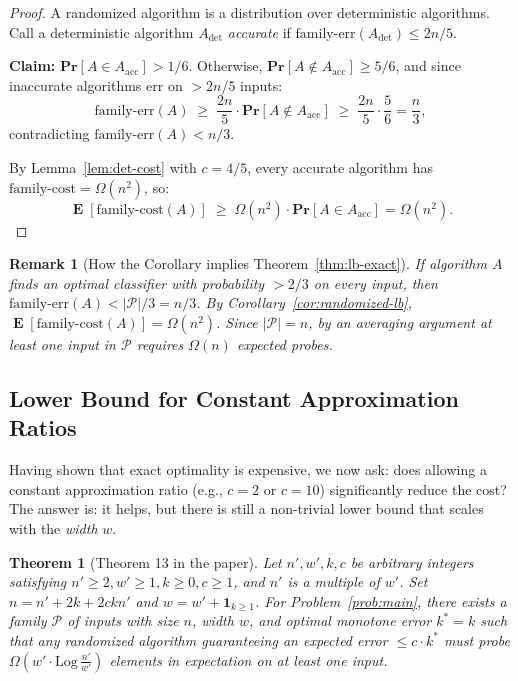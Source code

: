 \documentclass[11pt, a4paper]{article}
\theoremstyle{boxed}
\newtheorem{innertheorem}{Theorem}[section]
\newtheorem{innerremark}{Remark}[section]
\newenvironment{theorem}
  {\begin{mdframed}[style=thmstyle]\begin{innertheorem}}
  {\end{innertheorem}\end{mdframed}}
\newenvironment{remark}
  {\begin{mdframed}[style=notestyle]\begin{innerremark}}
  {\end{innerremark}\end{mdframed}}
\DeclareMathOperator{\E}{\mathbf{E}}
\renewcommand{\Pr}{\mathbf{Pr}}
\newcommand{\kstar}{k^{*}}
\begin{document}
\begin{proof}
  A randomized algorithm is a distribution over deterministic algorithms. Call a deterministic algorithm $A_\mathrm{det}$ \emph{accurate} if $\mathrm{family\text{-}err}(A_\mathrm{det}) \le 2n/5$.

  \textbf{Claim:} $\Pr[A \in A_\mathrm{acc}] > 1/6$. Otherwise, $\Pr[A \notin A_\mathrm{acc}] \ge 5/6$, and since inaccurate algorithms err on $> 2n/5$ inputs:
  \[
    \mathrm{family\text{-}err}(A) \;\ge\; \frac{2n}{5} \cdot \Pr[A \notin A_\mathrm{acc}] \;\ge\; \frac{2n}{5} \cdot \frac{5}{6} = \frac{n}{3},
  \]
  contradicting $\mathrm{family\text{-}err}(A) < n/3$.

  By Lemma~\ref{lem:det-cost} with $c = 4/5$, every accurate algorithm has $\mathrm{family\text{-}cost} = \Omega(n^2)$, so:
  \[
    \E[\mathrm{family\text{-}cost}(A)] \;\ge\; \Omega(n^2) \cdot \Pr[A \in A_\mathrm{acc}] = \Omega(n^2).
  \]
\end{proof}

\begin{remark}[How the Corollary implies Theorem~\ref{thm:lb-exact}]
  If algorithm $A$ finds an optimal classifier with probability $> 2/3$ on \emph{every} input, then $\mathrm{family\text{-}err}(A) < |\mathcal{P}|/3 = n/3$. By Corollary~\ref{cor:randomized-lb}, $\E[\mathrm{family\text{-}cost}(A)] = \Omega(n^2)$. Since $|\mathcal{P}| = n$, by an averaging argument at least one input in $\mathcal{P}$ requires $\Omega(n)$ expected probes.
\end{remark}


\subsection{Lower Bound for Constant Approximation Ratios}\label{sec:lb-constant}

Having shown that exact optimality is expensive, we now ask: does allowing a constant approximation ratio (e.g., $c = 2$ or $c = 10$) significantly reduce the cost? The answer is: it helps, but there is still a non-trivial lower bound that scales with the \emph{width} $w$.

\begin{theorem}[Theorem 13 in the paper]\label{thm:lb-constant}
  Let $n', w', k, c$ be arbitrary integers satisfying $n' \ge 2, w' \ge 1, k \ge 0, c \ge 1$, and $n'$ is a multiple of $w'$. Set $n = n' + 2k + 2ckn'$ and $w = w' + \mathbf{1}_{k \ge 1}$. For Problem~\ref{prob:main}, there exists a family $\mathcal{P}$ of inputs with size $n$, width $w$, and optimal monotone error $\kstar = k$ such that any randomized algorithm guaranteeing an expected error $\le c \cdot \kstar$ must probe $\Omega(w' \cdot \mathrm{Log}\,\frac{n'}{w'})$ elements in expectation on at least one input.
\end{theorem}
\end{document}

